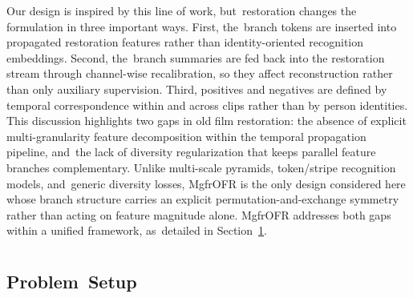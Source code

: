\documentclass[symmetry,article,accept,pdftex,moreauthors]{Definitions/mdpi}
\begin{document}
Our design is inspired by this line of work, but~restoration changes the formulation in three important ways. First, the~branch tokens are inserted into propagated restoration features rather than identity-oriented recognition embeddings. Second, the~branch summaries are fed back into the restoration stream through channel-wise recalibration, so they affect reconstruction rather than only auxiliary supervision. Third, positives and negatives are defined by temporal correspondence within and across clips rather than by person identities. This discussion highlights two gaps in old film restoration: the absence of explicit multi-granularity feature decomposition within the temporal propagation pipeline, and~the lack of diversity regularization that keeps parallel feature branches complementary. Unlike multi-scale pyramids, token/stripe recognition models, and~generic diversity losses, MgfrOFR is the only design considered here whose branch structure carries an explicit permutation-and-exchange symmetry rather than acting on feature magnitude alone. MgfrOFR addresses both gaps within a unified framework, as~detailed in Section~\ref{sec:method}.

%
\section{ %
}
\label{sec:method}
\unskip

\subsection{Problem~Setup}
\label{subsec:problem_setup}
\end{document}

